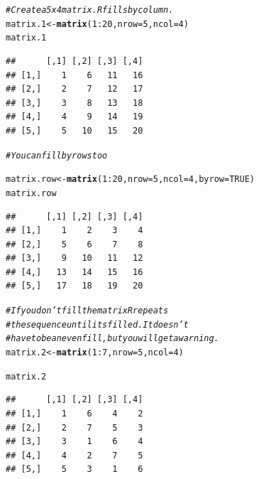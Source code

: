 \documentclass{article}\usepackage[]{graphicx}\usepackage[]{color}
\makeatletter
\newcommand{\hlnum}[1]{\textcolor[rgb]{0.686,0.059,0.569}{#1}}%
\newcommand{\hlcom}[1]{\textcolor[rgb]{0.678,0.584,0.686}{\textit{#1}}}%
\newcommand{\hlopt}[1]{\textcolor[rgb]{0,0,0}{#1}}%
\newcommand{\hlstd}[1]{\textcolor[rgb]{0.345,0.345,0.345}{#1}}%
\newcommand{\hlkwb}[1]{\textcolor[rgb]{0.69,0.353,0.396}{#1}}%
\newcommand{\hlkwc}[1]{\textcolor[rgb]{0.333,0.667,0.333}{#1}}%
\newcommand{\hlkwd}[1]{\textcolor[rgb]{0.737,0.353,0.396}{\textbf{#1}}}%
\newenvironment{kframe}{%
 \def\at@end@of@kframe{}%
 \ifinner\ifhmode%
  \def\at@end@of@kframe{\end{minipage}}%
  \begin{minipage}{\columnwidth}%
 \fi\fi%
 \def\FrameCommand##1{\hskip\@totalleftmargin \hskip-\fboxsep
 \colorbox{shadecolor}{##1}\hskip-\fboxsep
     \hskip-\linewidth \hskip-\@totalleftmargin \hskip\columnwidth}%
 \MakeFramed {\advance\hsize-\width
   \@totalleftmargin\z@ \linewidth\hsize
   \@setminipage}}%
 {\par\unskip\endMakeFramed%
 \at@end@of@kframe}
\newenvironment{knitrout}{}{} %
\makeatother
\begin{document}
\begin{knitrout}
\color{fgcolor}\begin{kframe}
\begin{alltt}
  \hlcom{# Create a 5 x 4 matrix. R fills by column.}
  \hlstd{matrix.1} \hlkwb{<-} \hlkwd{matrix}\hlstd{(}\hlnum{1}\hlopt{:}\hlnum{20}\hlstd{,} \hlkwc{nrow}\hlstd{=}\hlnum{5}\hlstd{,} \hlkwc{ncol}\hlstd{=}\hlnum{4}\hlstd{)}
  \hlstd{matrix.1}
\end{alltt}
\begin{verbatim}
##      [,1] [,2] [,3] [,4]
## [1,]    1    6   11   16
## [2,]    2    7   12   17
## [3,]    3    8   13   18
## [4,]    4    9   14   19
## [5,]    5   10   15   20
\end{verbatim}
\begin{alltt}
  \hlcom{# You can fill by rows too}

  \hlstd{matrix.row} \hlkwb{<-} \hlkwd{matrix}\hlstd{(}\hlnum{1}\hlopt{:}\hlnum{20}\hlstd{,} \hlkwc{nrow} \hlstd{=} \hlnum{5}\hlstd{,} \hlkwc{ncol}\hlstd{=}\hlnum{4}\hlstd{,} \hlkwc{byrow} \hlstd{=} \hlnum{TRUE}\hlstd{)}
  \hlstd{matrix.row}
\end{alltt}
\begin{verbatim}
##      [,1] [,2] [,3] [,4]
## [1,]    1    2    3    4
## [2,]    5    6    7    8
## [3,]    9   10   11   12
## [4,]   13   14   15   16
## [5,]   17   18   19   20
\end{verbatim}
\begin{alltt}
  \hlcom{# If you don't fill the matrix R repeats}
  \hlcom{# the sequence until its filled. It doesn't}
  \hlcom{# have to be an even fill, but you will get a warning.}
  \hlstd{matrix.2} \hlkwb{<-} \hlkwd{matrix}\hlstd{(}\hlnum{1}\hlopt{:}\hlnum{7}\hlstd{,} \hlkwc{nrow}\hlstd{=}\hlnum{5}\hlstd{,} \hlkwc{ncol}\hlstd{=}\hlnum{4}\hlstd{)}
\end{alltt}


{\ttfamily\noindent\color{warningcolor}{\#\# Warning in matrix(1:7, nrow = 5, ncol = 4): data length [7] is not a sub-multiple or multiple of the number of rows [5]}}\begin{alltt}
  \hlstd{matrix.2}
\end{alltt}
\begin{verbatim}
##      [,1] [,2] [,3] [,4]
## [1,]    1    6    4    2
## [2,]    2    7    5    3
## [3,]    3    1    6    4
## [4,]    4    2    7    5
## [5,]    5    3    1    6
\end{verbatim}
\end{kframe}
\end{knitrout}
    
\end{document}
